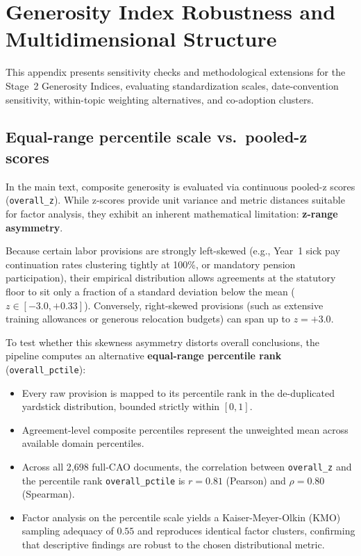\section{Generosity Index Robustness and Multidimensional Structure}
\label{app:indices_robustness}

This appendix presents sensitivity checks and methodological extensions for the Stage~2 Generosity Indices, evaluating standardization scales, date-convention sensitivity, within-topic weighting alternatives, and co-adoption clusters.

\subsection*{Equal-range percentile scale vs.\ pooled-z scores}

In the main text, composite generosity is evaluated via continuous pooled-z scores (\texttt{overall\_z}). While z-scores provide unit variance and metric distances suitable for factor analysis, they exhibit an inherent mathematical limitation: \textbf{z-range asymmetry}.

Because certain labor provisions are strongly left-skewed (e.g., Year~1 sick pay continuation rates clustering tightly at 100\%, or mandatory pension participation), their empirical distribution allows agreements at the statutory floor to sit only a fraction of a standard deviation below the mean ($z \in [-3.0, +0.33]$). Conversely, right-skewed provisions (such as extensive training allowances or generous relocation budgets) can span up to $z = +3.0$.

To test whether this skewness asymmetry distorts overall conclusions, the pipeline computes an alternative \textbf{equal-range percentile rank} (\texttt{overall\_pctile}):
\begin{itemize}
    \item Every raw provision is mapped to its percentile rank in the de-duplicated yardstick distribution, bounded strictly within $[0, 1]$.
    \item Agreement-level composite percentiles represent the unweighted mean across available domain percentiles.
    \item Across all 2,698 full-CAO documents, the correlation between \texttt{overall\_z} and the percentile rank \nolinkurl{overall_pctile} is $r = 0.81$ (Pearson) and $\rho = 0.80$ (Spearman).
    \item Factor analysis on the percentile scale yields a Kaiser-Meyer-Olkin (KMO) sampling adequacy of $0.55$ and reproduces identical factor clusters, confirming that descriptive findings are robust to the chosen distributional metric.
\end{itemize}


